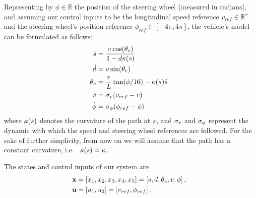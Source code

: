 	Representing by %
	$\phi\in\mathbb{R}$ %
	the position of the steering wheel (measured in radians), and assuming our control inputs to be the longitudinal speed reference %
	$v_{ref}\in\mathbb{R}^+$ %
	and the steering wheel's position reference %
	$\phi_{ref}\in[-4\pi, 4\pi]$, %
	the vehicle's model can be formulated as follows:
	\begin{subequations}
	\begin{align}	
		\dot{s} 	& = \frac{v\cos(\theta_e)}{1-d\kappa(s)} 
		\label{eq:non_linear_model_1}\\
		\dot{d}& = v\sin(\theta_e) 
		\label{eq:non_linear_model_2}\\
		\dot{\theta_e}    & = \frac{v}{L}\tan(\phi/16 ) - \kappa(s)\dot{s} 
		\label{eq:non_linear_model_3}\\
		\dot{v} & = \sigma_v(v_{ref}-v) 
		\label{eq:non_linear_model_4}\\
		\dot{\phi} & = \sigma_\phi(\phi_{ref}-\phi) 
		\label{eq:non_linear_model_5}
	\end{align}
	\end{subequations}
	where %
	$\kappa(s)$ %
	denotes the curvature of the path at %
	$s$, %
	and %
	$\sigma_v$ %
	and %
	$\sigma_\phi$ %
	represent the dynamic with which the speed and steering wheel references are followed.
	For the sake of further simplicity, from now on we will assume that the path has a constant curvature, i.e.\ %
	$\kappa(s) = \kappa$. 
	\par
	The states and control inputs of our system are
	\begin{align}
		\mathbf{\state} & = 
			\left[ \stat{1},\stat{2},\stat{3},\stat{4},\stat{5}\right] = %
			\left[\pathCoor, \distToPath, \yawErr, \speed, \steering\right] \label{eq:stateVector}, \\ 
		\mathbf{\control} & = 
			\left[ \con{1},\con{2} \right] = %
			\left[ \speed_{ref}, \steering_{ref} \right].
	\end{align}
